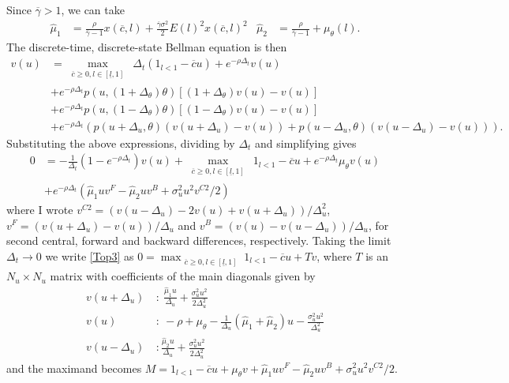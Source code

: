 \documentclass[11pt]{article}
\theoremstyle{plain}
\begin{document}
Since $\overline{\gamma}>1$, we can take 
\begin{align*}
\hat{\mu}_1 & = \frac{\rho}{\overline{\gamma}-1}x(\overline{c},l) + \frac{\overline{\gamma}\sigma^2}{2} E(l)^2x(\overline{c},l)^2 &
\hat{\mu}_2 & = \frac{\rho}{\overline{\gamma}-1} + \mu_{\theta}(l).
\end{align*}
The discrete-time, discrete-state Bellman equation is then
\begin{align*}
v(u) & = \max_{\substack{\overline{c} \geq 0, l \in [\underline{l},1]}} \ \Delta_t(1_{l<1} - \overline{c}u) + e^{-\rho \Delta_t}v(u)
\\ & + e^{-\rho \Delta_t}p(u, (1 + \Delta_{\theta})\theta)[(1+\Delta_{\theta})v(u) - v(u)]
\\ & + e^{-\rho \Delta_t}p(u, (1 - \Delta_{\theta})\theta)[(1-\Delta_{\theta})v(u) - v(u)]
\\ & + e^{-\rho \Delta_t}{\left(p(u+\Delta_u,\theta)(v(u+\Delta_u) - v(u)) + p(u-\Delta_u,\theta)(v(u-\Delta_u) - v(u))\right)}.
\end{align*}
Substituting the above expressions, dividing by $\Delta_t$ and simplifying gives
\begin{equation}
\begin{aligned} 
0 & = -\frac{1}{\Delta_t}(1-e^{-\rho \Delta_t})v(u) + \max_{\substack{\overline{c} \geq 0, l \in [\underline{l},1]}} \ 1_{l<1} - \overline{c}u + e^{-\rho \Delta_t}\mu_{\theta}v(u)
\\ & + e^{-\rho \Delta_t}{\left(\hat{\mu}_1uv^F - \hat{\mu}_2uv^B + \sigma_u^2u^2v^{C2}/2\right)}
\end{aligned}
\label{Top3}
\end{equation}
where I wrote $v^{C2} = (v(u-\Delta_u) - 2v(u) + v(u+\Delta_u))/\Delta_u^2$, $v^F = (v(u+\Delta_u) - v(u))/\Delta_u$ and $v^B = (v(u) - v(u-\Delta_u))/\Delta_u$, for second central, forward and backward differences, respectively. Taking the limit $\Delta_t \rightarrow 0$ we write \eqref{Top3} as $0 = \max_{\substack{\overline{c} \geq 0, l \in [\underline{l},1]}} 1_{l<1} - \overline{c}u + Tv$, where $T$ is an $N_u \times N_u$ matrix with coefficients of the main diagonals given by 
\begin{equation}
\begin{aligned}
v(u+\Delta_u) \ & : \ \frac{\hat{\mu}_1u}{\Delta_u} + \frac{\sigma_u^2u^2}{2\Delta_u^2}
\\ v(u) \ & : \ - \rho + \mu_{\theta} - \frac{1}{\Delta_u}(\hat{\mu}_1+\hat{\mu}_2)u - \frac{\sigma_u^2u^2}{\Delta_u^2} 
\\ v(u-\Delta_u) \ & :  \frac{\hat{\mu}_2u}{\Delta_u} + \frac{\sigma_u^2u^2}{2\Delta_u^2}
\end{aligned}
\label{diagonals}
\end{equation}
and the maximand becomes $M = 1_{l<1} - \overline{c}u + \mu_{\theta}v + \hat{\mu}_1uv^F - \hat{\mu}_2uv^B + \sigma_u^2u^2v^{C2}/2$.
\end{document}
